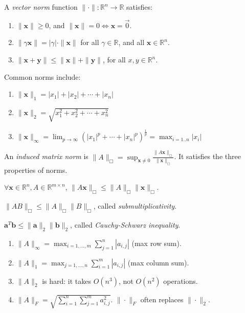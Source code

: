 \documentclass[landscape,10pt,letterpaper]{article}
\begin{document}
\begin{multicols}{4}
A \emph{vector norm} function $\| \cdot \| : \mathbb{R}^n \to \mathbb{R}$ satisfies:
\begin{enumerate}[topsep=0pt, partopsep=0pt, itemsep=-4pt]
\item $\| \mathbf{x} \| \geq 0$, and $\| \mathbf{x} \| = 0 \Leftrightarrow \mathbf{x} = \vec{0}$.
\item $\| \gamma \mathbf{x} \| = |\gamma| \cdot \| \mathbf{x} \|$ for all $\gamma \in \mathbb{R}$, and all $\mathbf{x} \in \mathbb{R}^n$.
\item $\| \mathbf{x} + \mathbf{y} \| \leq \| \mathbf{x} \| + \| \mathbf{y} \|$, for all $x, y \in \mathbb{R}^n$.
\end{enumerate}
Common norms include:
\begin{enumerate}[topsep=0pt, partopsep=0pt, itemsep=-4pt]
\item $\| \mathbf{x} \|_1 = | x_1 | + | x_2 | + \cdots + |x_n|$
\item $\| \mathbf{x} \|_2 = \sqrt{x_1^2 + x_2^2 + \cdots + x_n^2}$
\item $\| \mathbf{x} \|_\infty = \displaystyle \lim_{p \to \infty} \textstyle \left( | x_1 |^p + \cdots + | x_n |^p \right)^\frac{1}{p} = \displaystyle \max_{i=1..n} \textstyle |x_i|$
\end{enumerate}

An \emph{induced matrix norm} is $\|A\|_\Box = \sup_{\mathbf{x} \neq 0} \frac{\| A \mathbf{x} \|_\Box}{\| \mathbf{x} \|_\Box}$.  It satisfies the three properties of norms.

$\forall \mathbf{x} \in \mathbb{R}^n, A \in \mathbb{R}^{m \times n}$, $\|A\mathbf{x}\|_\Box \leq \|A\|_\Box \|\mathbf{x}\|_\Box$.

$\| A B \|_\Box \leq \| A \|_\Box \| B \|_\Box$, called \emph{submultiplicativity}.

$\mathbf{a}^T \mathbf{b} \leq \| \mathbf{a} \|_2 \| \mathbf{b} \|_2$, called \emph{Cauchy-Schwarz inequality}.

\begin{enumerate}[topsep=0pt, partopsep=0pt, itemsep=-4pt]
\item $\|A\|_\infty = \max_{i=1,\ldots,m} \sum_{j=1}^n | a_{i,j} |$ (max row sum).
\item $\|A\|_1 = \max_{j=1,\ldots,n} \sum_{i=1}^m | a_{i,j} |$ (max column sum).
\item $\|A\|_2$ is hard: it takes $O(n^3)$, not $O(n^2)$ operations.
\item $\|A\|_F = \sqrt{\sum_{i=1}^n \sum_{j=1}^m a_{i,j}^2}$. $\|\cdot\|_F$ often replaces $\|\cdot\|_2$.
\end{enumerate}


\end{multicols}
\end{document}
